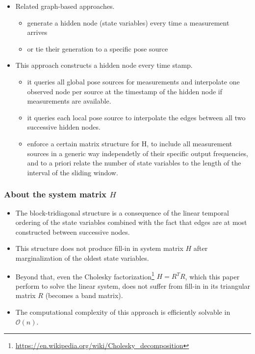 \documentclass[letterpaper,11pt]{article}
\begin{document}
\begin{itemize}
	\item Related graph-based approaches.
	\begin{itemize}
		\item generate a hidden node (state variables) every time a measurement arrives
		\item or tie their generation to a specific pose source
	\end{itemize}
	\item This approach constructs a hidden node every time stamp.
	\begin{itemize}
		\item it queries all global pose sources for measurements and interpolate one observed node per source at the timestamp of the hidden node if measurements are available.
		\item it queries each local pose source to interpolate the edges between all two successive hidden nodes.
		\item enforce a certain matrix structure for H, to include all measurement sources in a generic way independetly of their specific output frequencies, and to a priori relate the number of state variables to the length of the interval of the sliding window.
	\end{itemize}
\end{itemize}

\subsubsection{About the system matrix $H$}

\begin{itemize}
	\item The block-tridiagonal structure is a consequence of the linear temporal ordering of the state variables combined with the fact that edges are at most constructed between successive nodes.
	\item This structure does not produce fill-in in system matrix $H$ after marginalization of the oldest state variables.
	\item Beyond that, even the Cholesky factorization\footnote{\url{https://en.wikipedia.org/wiki/Cholesky_decomposition}} $H=R^TR$, which this paper perform to solve the linear system, does not suffer from fill-in in its triangular matrix $R$ (becomes a band matrix).
	\item The computational complexity of this approach is efficiently solvable in $\mathcal{O}(n)$.
\end{itemize}
\end{document}
